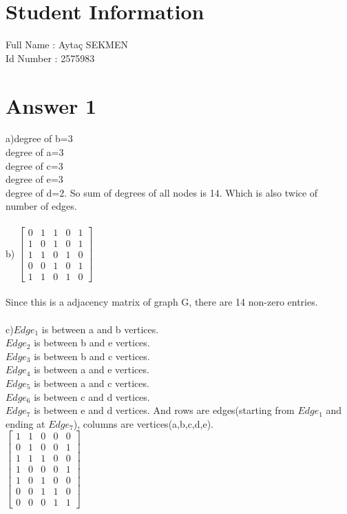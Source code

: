\documentclass[12pt]{article}
\begin{document}
\section*{Student Information } 
Full Name :  Aytaç SEKMEN \\
Id Number :  2575983 \\

\section*{Answer 1}
a)degree of b=3\\
degree of a=3\\
degree of c=3\\
degree of e=3\\
degree of d=2. So sum of degrees of all nodes is 14. Which is also twice of number of edges.\\\\
b) $\begin{bmatrix}
0& 1 & 1& 0& 1\\
1& 0 & 1& 0 &1\\
1& 1 & 0& 1 &0\\
0& 0 & 1& 0 &1\\
1& 1 & 0& 1 &0
\end{bmatrix}$\\\\ Since this is a adjacency matrix of graph G, there are 14 non-zero entries.\\\\
c)$Edge_1$ is between a and b vertices.\\
$Edge_2$ is between b and e vertices.\\
$Edge_3$ is between b and c vertices.\\
$Edge_4$ is between a and e vertices.\\
$Edge_5$ is between a and c vertices.\\
$Edge_6$ is between c and d vertices.\\
$Edge_7$ is between e and d vertices. And rows are edges(starting from $Edge_1$ and ending at $Edge_7$), columns are vertices(a,b,c,d,e).\\
$\begin{bmatrix}
1& 1 & 0& 0& 0\\
0& 1 & 0& 0 &1\\
1& 1 & 1& 0 &0\\
1& 0 & 0& 0 &1\\
1& 0 & 1& 0 &0\\
0& 0 & 1& 1 &0\\
0& 0 & 0& 1 &1
\end{bmatrix}$\\\\
\end{document}
